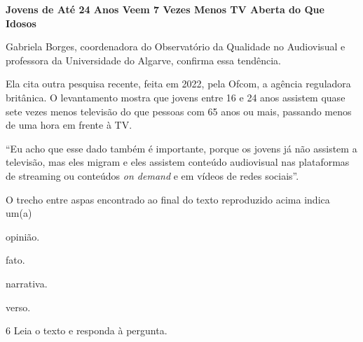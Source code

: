 \begin{myquote}
\textbf{Jovens de Até 24 Anos Veem 7 Vezes Menos TV Aberta do Que Idosos}

Gabriela Borges, coordenadora do Observatório da Qualidade no
Audiovisual e professora da Universidade do Algarve, confirma essa
tendência.

Ela cita outra pesquisa recente, feita em 2022, pela Ofcom, a agência
reguladora britânica. O levantamento mostra que jovens entre 16 e 24
anos assistem quase sete vezes menos televisão do que pessoas com 65
anos ou mais, passando menos de uma hora em frente à TV.

``Eu acho que esse dado também é importante, porque os jovens já não
assistem a televisão, mas eles migram e eles assistem conteúdo
audiovisual nas plataformas de streaming ou conteúdos \textit{on demand}
e em vídeos de redes sociais''.

\end{myquote}

O trecho entre aspas encontrado ao final do texto reproduzido acima
indica um(a)

\begin{multicols}{2}
\begin{escolha}
  \item opinião.

  \item fato.

  \item narrativa.

  \item verso.
\end{escolha}
\end{multicols}

\num{6} Leia o texto e responda à pergunta.


